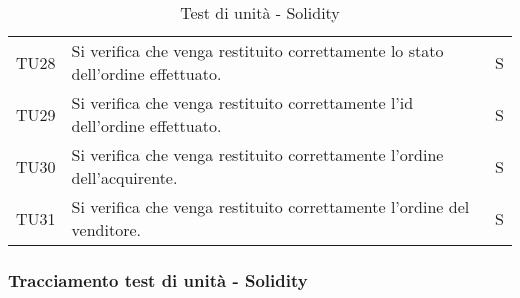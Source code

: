 \begin{table}[H]
\begin{tabular}{c|p{10cm}|c}
    TU28 & Si verifica che venga restituito correttamente lo stato dell'ordine effettuato.                                                             & S  \\
    TU29 & Si verifica che venga restituito correttamente l'id dell'ordine effettuato.                                                                 & S  \\
    TU30 & Si verifica che venga restituito correttamente l'ordine dell'acquirente.                                                                    & S  \\
    TU31 & Si verifica che venga restituito correttamente l'ordine del venditore.                                                                      & S  \\
  \end{tabular}
  \caption{Test di unità - Solidity}
\end{table}



\subsubsection{Tracciamento test di unità - Solidity}\label{subsubsection:tracciamento_test_unita}

